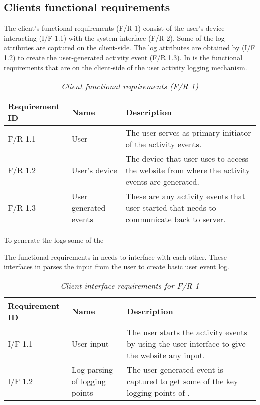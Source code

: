 \clearpage

\subsection{Clients functional requirements}

The client's functional requirements (F/R 1) consist of the user's device interacting (I/F 1.1) with the system interface (F/R 2). Some of the log attributes are captured on the client-side. The log attributes are obtained by (I/F 1.2) to create the user-generated activity event (F/R 1.3). In  is the functional requirements that are on the client-side of the user activity logging mechanism.

\begin{table}[!htb]
	\centering
	\small
	\caption[Client functional requirements]
	{\textit{Client functional requirements (F/R 1)}}
	\label{tbl:Ch2_Client_Functional_Requirements}
	\begin{tabularx}{\textwidth}{|l|l|X|}
		\hline \textbf{Requirement ID} & \textbf{Name} & \textbf{Description} \\
		\hline F/R 1.1 & User & The user serves as primary initiator of the activity events.\\
		\hline F/R 1.2 & User's device & The device that user uses to access the website from where the activity events are generated.\\
		\hline F/R 1.3 & User generated events & These are any activity events that user started that needs to communicate back to server.\\
		\hline
	\end{tabularx}
\end{table}

To generate the logs some of the 


\clearpage

The functional requirements in  needs to interface with each other. These interfaces in  parses the input from the user to create basic user event log.

\begin{table}[!htb]
	\centering
	\small
	\caption[Client interface requirements]
	{\textit{Client interface requirements for F/R 1}}
	\label{tbl:Ch2_Client_Interface_Requirements}
	\begin{tabularx}{\textwidth}{|l|l|X|}
		\hline \textbf{Requirement ID} & \textbf{Name} & \textbf{Description} \\
		\hline I/F 1.1 & User input & The user starts the activity events by using the user interface to give the website any input.\\
		\hline I/F 1.2 & Log parsing of logging points & The user generated event is captured to get some of the key logging points of \Cref{tbl:CH1_Log_Basic_Attributes}.\\
		\hline
	\end{tabularx}
\end{table}

